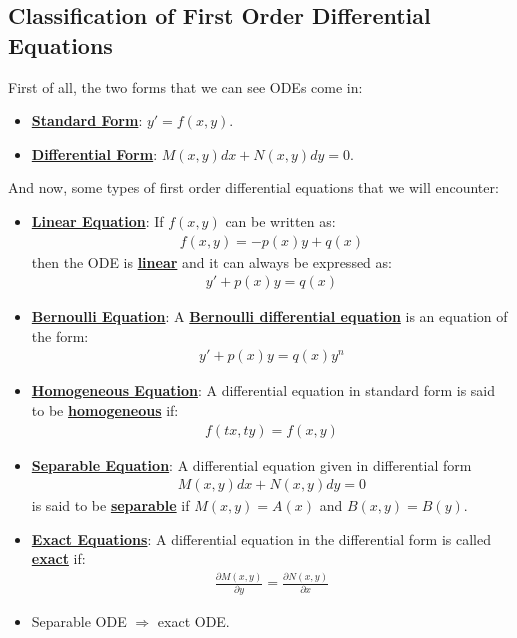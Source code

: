 \documentclass[11pt]{article}
\newcommand{\dfn}[1]{\underline{\textbf{#1}}}
\begin{document}
\subsection{Classification of First Order Differential Equations}
First of all, the two forms that we can see ODEs come in: 
\begin{itemize}[noitemsep]
	\item \dfn{Standard Form}: $y' = f(x,y)$. 
	\item \dfn{Differential Form}: $M(x,y) dx + N(x,y) dy =0$. 
\end{itemize}
And now, some types of first order differential equations that we will encounter: 
\begin{itemize}[noitemsep]
	\item \dfn{Linear Equation}: If $f(x,y)$ can be written as: 
	\begin{align}
		f(x,y) = -p(x) y + q(x) 	
	\end{align}
	then the ODE is \dfn{linear} and it can always be expressed as: 
	\begin{align}
		y' + p(x) y = q(x) 	
	\end{align}
	\item \dfn{Bernoulli Equation}: A \dfn{Bernoulli differential equation} is an equation of the form: 
	\begin{align}
		y' + p(x) y = q(x) y^n	
	\end{align}
	\item \dfn{Homogeneous Equation}: A differential equation in standard form is said to be \dfn{homogeneous} if:
	\begin{align}
		f(tx, ty) = f(x,y) 	
	\end{align}
	\item \dfn{Separable Equation}: A differential equation given in differential form 
	\begin{align*}
			M(x,y) dx + N(x,y) dy = 0 
	\end{align*}
	is said to be \dfn{separable} if $M(x,y) = A(x)$ and $B(x,y) = B(y)$. 
	\item \dfn{Exact Equations}: A differential equation in the differential form is called \dfn{exact} if: 
	\begin{align}
		\frac{\partial M(x,y)}{\partial y} = \frac{\partial N(x,y)}{\partial x}	
	\end{align}
	\item Separable ODE $\Rightarrow$ exact ODE.
\end{itemize}
\end{document}
